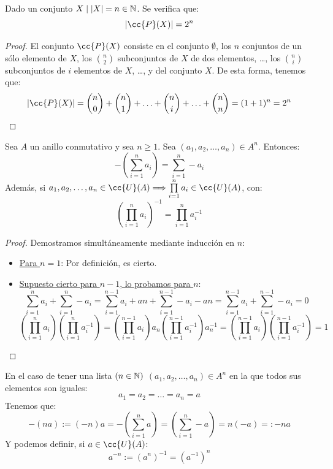 \begin{prop}
    Dado un conjunto $X \mid |X|=n\in \mathbb N$. Se verifica que:
    $$|\cc{P}(X)| = 2^n$$
\end{prop}
\begin{proof}
    El conjunto $\cc{P}(X)$ consiste en el conjunto $\emptyset$, los $n$ conjuntos de un sólo elemento de $X$, los $\binom{n}{2}$ subconjuntos de $X$ de dos elementos, \ldots, los $\binom{n}{i}$ subconjuntos de $i$ elementos de $X$,
    \ldots, y del conjunto $X$. De esta forma, tenemos que:
    $$|\cc{P}(X)| = \binom{n}{0} + \binom{n}{1} + \ldots + \binom{n}{i} + \ldots + \binom{n}{n} = (1+1)^n = 2^n$$
\end{proof}

\begin{prop}
    Sea $A$ un anillo conmutativo y sea $n \geq 1$. Sea $(a_1, a_2, \ldots, a_n) \in A^n$. Entonces:
    $$-\left( \sum_{i=1}^n a_i \right) = \sum_{i=1}^n -a_i $$
    Además, si $a_1, a_2, \ldots, a_n \in \cc{U}(A) \Longrightarrow \prod\limits_{i=1}^n a_i \in \cc{U}(A)$, con:
    $$\left(\prod\limits_{i=1}^n a_i\right)^{-1} = \prod_{i=1}^n a_i^{-1}$$
\end{prop}
\begin{proof}
    Demostramos simultáneamente mediante inducción en $n$:
    \begin{itemize}
        \item \underline{Para $n=1$}: Por definición, es cierto.
        \item \underline{Supuesto cierto para $n-1$, lo probamos para $n$}:
        $$\sum_{i=1}^n a_i + \sum_{i=1}^n -a_i = \sum_{i=1}^{n-1} a_i + an + \sum_{i=1}^{n-1} -a_i -an = \sum_{i=1}^{n-1}a_i  + \sum_{i=1}^{n-1}-a_i = 0$$
        $$\left(\prod\limits_{i=1}^n a_i\right)\left(\prod\limits_{i=1}^n a_i^{-1}\right) =
        \left(\prod\limits_{i=1}^{n-1} a_i\right)a_n \left(\prod\limits_{i=1}^{n-1} a_i^{-1}\right)a_n^{-1} =
        \left(\prod\limits_{i=1}^{n-1} a_i\right) \left(\prod\limits_{i=1}^{n-1} a_i^{-1}\right) = 1$$
    \end{itemize}
\end{proof}


En el caso de tener una lista $(n\in \mathbb N)$ $(a_1, a_2, \ldots, a_n) \in A^n$ en la que todos sus elementos son iguales:
$$a_1 = a_2 = \ldots = a_n = a$$
Tenemos que:
$$-(na) := (-n)a = -\left(\sum_{i=1}^n a\right) = \left(\sum_{i=1}^n -a\right) = n(-a) =: -na$$
Y podemos definir, si $a \in \cc{U}(A)$:
$$a^{-n} := (a^n)^{-1} = (a^{-1})^n$$


